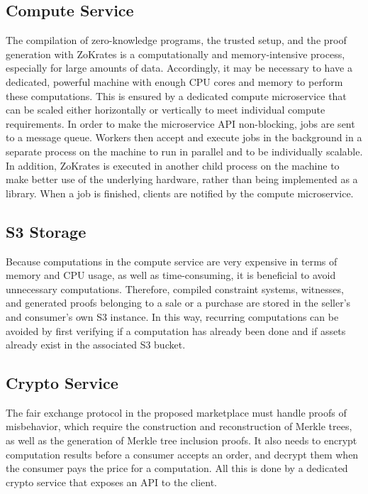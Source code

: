 \subsection{Compute Service}
\label{subsec:compute}

The compilation of zero-knowledge programs, the trusted setup, and the proof generation with ZoKrates is a computationally and memory-intensive process, especially for large amounts of data. Accordingly, it may be necessary to have a dedicated, powerful machine with enough CPU cores and memory to perform these computations. This is ensured by a dedicated compute microservice that can be scaled either horizontally or vertically to meet individual compute requirements. In order to make the microservice API non-blocking, jobs are sent to a message queue. Workers then accept and execute jobs in the background in a separate process on the machine to run in parallel and to be individually scalable. In addition, ZoKrates is executed in another child process on the machine to make better use of the underlying hardware, rather than being implemented as a library. When a job is finished, clients are notified by the compute microservice.

\subsection{S3 Storage}
\label{subsec:s3}

Because computations in the compute service are very expensive in terms of memory and CPU usage, as well as time-consuming, it is beneficial to avoid unnecessary computations. Therefore, compiled constraint systems, witnesses, and generated proofs belonging to a sale or a purchase are stored in the seller's and consumer's own S3 instance. In this way, recurring computations can be avoided by first verifying if a computation has already been done and if assets already exist in the associated S3 bucket.

\subsection{Crypto Service}
\label{subsec:crypto}

The fair exchange protocol in the proposed marketplace must handle proofs of misbehavior, which require the construction and reconstruction of Merkle trees, as well as the generation of Merkle tree inclusion proofs. It also needs to encrypt computation results before a consumer accepts an order, and decrypt them when the consumer pays the price for a computation. All this is done by a dedicated crypto service that exposes an API to the client.

